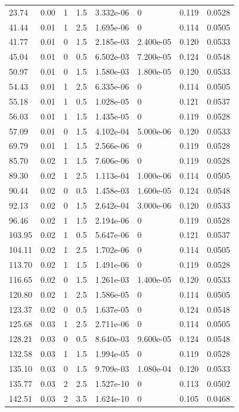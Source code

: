 \documentclass[preview]{standalone}
\begin{document}
{{\begin{tabular}{L{1.2cm}C{1.2cm} C{0.3cm}C{0.5cm} C{1.4cm}C{1.4cm} C{1.4cm}C{1.4cm}}
  23.74  &  0.00  & 1     & 1.5 &  3.332e-06  & 0  & 0.119 &  0.0528   \\ 
  41.44  &  0.01  & 1     & 2.5 &  1.695e-06  & 0  & 0.114 &  0.0505   \\ 
  41.77  &  0.01  & 0     & 1.5 &  2.185e-03  & 2.400e-05  & 0.120 &  0.0533   \\ 
  45.04  &  0.01  & 0     & 0.5 &  6.502e-03  & 7.200e-05  & 0.124 &  0.0548   \\ 
  50.97  &  0.01  & 0     & 1.5 &  1.580e-03  & 1.800e-05  & 0.120 &  0.0533   \\ 
  54.43  &  0.01  & 1     & 2.5 &  6.335e-06  & 0  & 0.114 &  0.0505   \\ 
  55.18  &  0.01  & 1     & 0.5 &  1.028e-05  & 0  & 0.121 &  0.0537   \\ 
  56.03  &  0.01  & 1     & 1.5 &  1.435e-05  & 0  & 0.119 &  0.0528   \\ 
  57.09  &  0.01  & 0     & 1.5 &  4.102e-04  & 5.000e-06  & 0.120 &  0.0533   \\ 
  69.79  &  0.01  & 1     & 1.5 &  2.566e-06  & 0  & 0.119 &  0.0528   \\ 
  85.70  &  0.02  & 1     & 1.5 &  7.606e-06  & 0  & 0.119 &  0.0528   \\ 
  89.30  &  0.02  & 1     & 2.5 &  1.113e-04  & 1.000e-06  & 0.114 &  0.0505   \\ 
  90.44  &  0.02  & 0     & 0.5 &  1.458e-03  & 1.600e-05  & 0.124 &  0.0548   \\ 
  92.13  &  0.02  & 0     & 1.5 &  2.642e-04  & 3.000e-06  & 0.120 &  0.0533   \\ 
  96.46  &  0.02  & 1     & 1.5 &  2.194e-06  & 0  & 0.119 &  0.0528   \\ 
  103.95  &  0.02  & 1     & 0.5 &  5.647e-06  & 0  & 0.121 &  0.0537   \\ 
  104.11  &  0.02  & 1     & 2.5 &  1.702e-06  & 0  & 0.114 &  0.0505   \\ 
  113.70  &  0.02  & 1     & 1.5 &  1.491e-06  & 0  & 0.119 &  0.0528   \\ 
  116.65  &  0.02  & 0     & 1.5 &  1.261e-03  & 1.400e-05  & 0.120 &  0.0533   \\ 
  120.80  &  0.02  & 1     & 2.5 &  1.586e-05  & 0  & 0.114 &  0.0505   \\ 
  123.37  &  0.02  & 0     & 0.5 &  1.637e-05  & 0  & 0.124 &  0.0548   \\ 
  125.68  &  0.03  & 1     & 2.5 &  2.711e-06  & 0  & 0.114 &  0.0505   \\ 
  128.21  &  0.03  & 0     & 0.5 &  8.640e-03  & 9.600e-05  & 0.124 &  0.0548   \\ 
  132.58  &  0.03  & 1     & 1.5 &  1.994e-05  & 0  & 0.119 &  0.0528   \\ 
  135.10  &  0.03  & 0     & 1.5 &  9.709e-03  & 1.080e-04  & 0.120 &  0.0533   \\ 
  135.77  &  0.03  & 2     & 2.5 &  1.527e-10  & 0  & 0.113 &  0.0502   \\ 
  142.51  &  0.03  & 2     & 3.5 &  1.624e-10  & 0  & 0.105 &  0.0468   \\ 
\hline 
\end{tabular} 

}}
\end{document}
